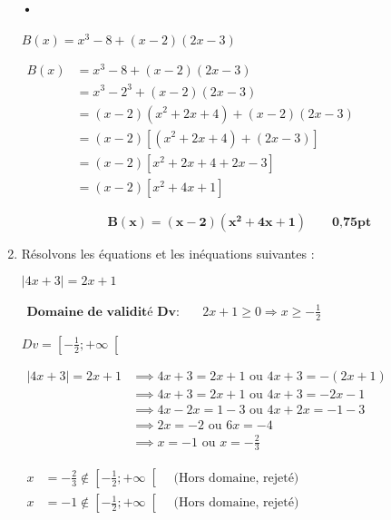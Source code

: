 \documentclass[12pt,a4paper]{article}
\begin{document}
\begin{enumerate}
\paragraph{•}   
\(
B(x) = x^3 - 8 + (x - 2)(2x - 3)
\)

\(
\begin{aligned}
B(x) &= x^3 - 8 + (x - 2)(2x - 3) \\
     &= x^3 - 2^3 + (x - 2)(2x - 3) \\
     &= (x - 2)(x^2 + 2x + 4) + (x - 2)(2x - 3) \\
     &= (x - 2) \left[(x^2 + 2x + 4) + (2x - 3) \right] \\
     &= (x - 2) \left[x^2 + 2x + 4 + 2x - 3 \right] \\
     &= (x - 2) \left[x^2 + 4x + 1 \right]
\end{aligned}
\)

\begin{tcolorbox}[colback=yellow!20, colframe=black, sharp corners]
    \[
    \mathbf{B(x) = (x - 2)(x^2 + 4x + 1)}\quad\quad \textbf{0,75pt}
    \]
\end{tcolorbox}
    
    \item Résolvons les équations et les inéquations suivantes :
    
    \( |4x + 3| = 2x + 1 \)

\(
\begin{aligned}
\textbf{Domaine de validité Dv:} & \quad 2x + 1 \geq 0 \Rightarrow x \geq -\frac{1}{2}
\end{aligned}
\)

\( Dv= \left[-\frac{1}{2};+\infty\right[ \)

\(
\begin{aligned}
|4x + 3| = 2x + 1 &\implies 4x + 3 = 2x + 1 \text{ ou } 4x + 3 = - (2x + 1) \\
                   &\implies 4x + 3 = 2x + 1 \text{ ou } 4x + 3 = -2x - 1 \\
                   &\implies 4x - 2x = 1 - 3 \text{ ou } 4x + 2x = -1 - 3 \\
                   &\implies 2x = -2 \text{ ou } 6x = -4 \\
                   &\implies x = -1 \text{ ou } x = -\frac{2}{3}
\end{aligned}
\)


\(
\begin{aligned}
x &= -\frac{2}{3}\notin \left[-\frac{1}{2};+\infty\right[ \quad \text{(Hors domaine, rejeté)}\\
x &= -1\notin \left[-\frac{1}{2};+\infty\right[ \quad \text{(Hors domaine, rejeté)}
\end{aligned}
\)


\end{enumerate}
\end{document}
